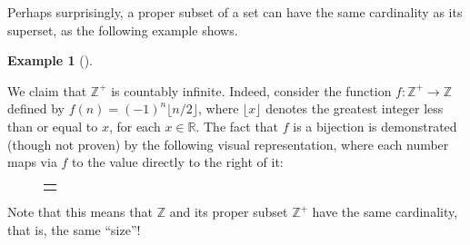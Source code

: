 \documentclass[10pt,]{book}
\theoremstyle{plain}
\theoremstyle{definition}
\theoremstyle{definition}
\theoremstyle{definition}
\newtheorem{example}[theorem]{Example}
\theoremstyle{definition}
\numberwithin{equation}{section}
\newlength{\panelmax}
\def\Z{\mathbb{Z}}
\def\R{\mathbb{R}}
\begin{document}
    Perhaps surprisingly, a proper subset of a set can have the
    same cardinality as its superset, as the following example
    shows.
\begin{example}[]\label{zplus}

        We claim that \(\Z^+\) is countably infinite. Indeed, consider the function \(f:\Z^+ \to \Z\) defined by \(f(n)=(-1)^n \lfloor n/2 \rfloor\), where \(\lfloor x \rfloor\)
        denotes the greatest integer less than or equal to \(x\), for each \(x\in \R\). The fact that \(f\) is a bijection is demonstrated (though not proven) by the following visual representation,
        where each number maps via \(f\) to the value directly to the right of it:
{%
\setlength{\panelmax}{0pt}
\newsavebox{\panelboxAtabular}
\newlength{\phAtabular}\setlength{\phAtabular}{\ht\panelboxAtabular+\dp\panelboxAtabular}
\settototalheight{\phAtabular}{\usebox{\panelboxAtabular}}
\setlength{\panelmax}{\maxof{\panelmax}{\phAtabular}}
\leavevmode%
\setlength{\tabcolsep}{0\textwidth}
\begin{figure}
\begin{tabular}{@{}*{1}{c}@{}}
\begin{minipage}[c][\panelmax][t]{1\textwidth}\usebox{\panelboxAtabular}\end{minipage}\end{tabular}
\end{figure}
}%

%
\par

        Note that this means that \(\Z\) and its proper subset \(\Z^+\)
        have the same cardinality, that is, the same ``size''!
\end{example}
\par
\end{document}
